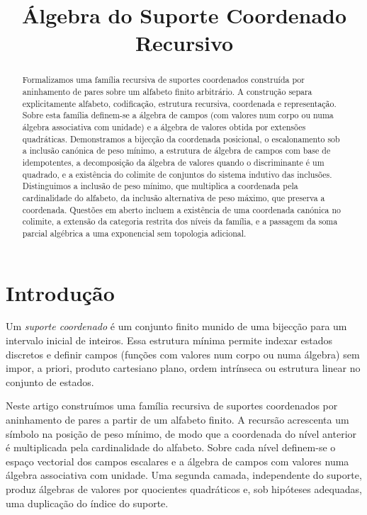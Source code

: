 \documentclass[11pt,a4paper]{article}
\title{Álgebra do Suporte Coordenado Recursivo}
\author{}
\date{}
\begin{document}
\maketitle

\begin{abstract}
\noindent
Formalizamos uma família recursiva de suportes coordenados construída por
aninhamento de pares sobre um alfabeto finito arbitrário.
A construção separa explicitamente alfabeto, codificação, estrutura recursiva,
coordenada e representação.
Sobre esta família definem-se a álgebra de campos (com valores num corpo ou
numa álgebra associativa com unidade) e a álgebra de valores obtida por
extensões quadráticas.
Demonstramos a bijecção da coordenada posicional, o escalonamento sob a
inclusão canónica de peso mínimo, a estrutura de álgebra de campos com base
de idempotentes, a decomposição da álgebra de valores quando o discriminante
é um quadrado, e a existência do colimite de conjuntos do sistema indutivo
das inclusões.
Distinguimos a inclusão de peso mínimo, que multiplica a coordenada pela
cardinalidade do alfabeto, da inclusão alternativa de peso máximo, que
preserva a coordenada.
Questões em aberto incluem a existência de uma coordenada canónica no
colimite, a extensão da categoria restrita dos níveis da família, e a
passagem da soma parcial algébrica a uma exponencial sem topologia adicional.
\end{abstract}

\tableofcontents
\newpage

\section{Introdução}

Um \emph{suporte coordenado} é um conjunto finito munido de uma bijecção para
um intervalo inicial de inteiros.
Essa estrutura mínima permite indexar estados discretos e definir campos
(funções com valores num corpo ou numa álgebra) sem impor, a priori, produto
cartesiano plano, ordem intrínseca ou estrutura linear no conjunto de estados.

Neste artigo construímos uma família recursiva de suportes coordenados por
aninhamento de pares a partir de um alfabeto finito.
A recursão acrescenta um símbolo na posição de peso mínimo, de modo que a
coordenada do nível anterior é multiplicada pela cardinalidade do alfabeto.
Sobre cada nível definem-se o espaço vectorial dos campos escalares e a
álgebra de campos com valores numa álgebra associativa com unidade.
Uma segunda camada, independente do suporte, produz álgebras de valores por
quocientes quadráticos e, sob hipóteses adequadas, uma duplicação do índice
do suporte.
\end{document}
